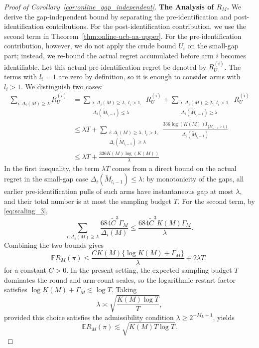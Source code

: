 \documentclass[
  12pt]{article}
\begin{document}
\begin{proof}[Proof of Corollary~\ref{cor:online_gap_independent}]

\textbf{The Analysis of $R_M$.} We derive the gap-independent bound by
separating the pre-identification and post-identification contributions. For the
post-identification contribution, we use the second term in
Theorem~\ref{thm:online-ucb-aa-upper}. For the pre-identification contribution,
however, we do not apply the crude bound \(U_i\) on the small-gap part; instead,
we re-bound the actual regret accumulated before arm \(i\) becomes identifiable.
Let this actual pre-identification regret be denoted by \(R_U^{(i)}\). The terms
with \(l_i=1\) are zero by definition, so it is enough to consider arms with
\(l_i>1\). We distinguish two cases:
	   \begin{align*}
	   \sum_{i:\Delta_i(M)\ge\lambda} R_{U}^{(i)} &= \sum_{\substack{i:\Delta_i(M)\ge\lambda,\; l_i>1,\\ \Delta_i(\tilde{M}_{l_i-1})\le\lambda}}  R_{U}^{(i)} + \sum_{\substack{i:\Delta_i(M)\ge\lambda,\; l_i>1,\\ \Delta_i(\tilde{M}_{l_i-1})\ge\lambda}}  R_{U}^{(i)}   \\
	   & \le \lambda T + \sum_{\substack{i:\Delta_i(M)\ge\lambda,\; l_i>1,\\ \Delta_i(\tilde{M}_{l_i-1})\ge\lambda}}  \frac{336 \log(K(M)) I_{ \{\tilde{M}_{l_i-1} >t_i\} } }{\Delta_i(\tilde{M}_{l_i-1})} \\
	   & \le \lambda T  + \frac{336 K(M) \log(K(M))}{\lambda}
	     \end{align*}
In the first inequality, the term \(\lambda T\) comes from a direct bound on
the actual regret in the small-gap case
\(\Delta_i(\tilde M_{l_i-1})\le\lambda\): by monotonicity of the gaps, all
earlier pre-identification pulls of such arms have instantaneous gap at most
\(\lambda\), and their total number is at most the sampling budget \(T\).
For the second term, by \eqref{eq:scaling_3},
\[
	\sum_{i:\Delta_i(M)\ge\lambda}
	\frac{684\tilde C^3\Gamma_M}{\Delta_i(M)}
	\le
	\frac{684\tilde C^3K(M)\Gamma_M}{\lambda}.
\]
Combining the two bounds gives
\[
\mathbb{E}R_M(\pi)
\le
\frac{C K(M)\{\log K(M)+\Gamma_M\}}{\lambda}
+2\lambda T ,
\]
for a constant \(C>0\). In the present setting, the expected sampling budget
\(T\) dominates the round and arm-count scales, so the logarithmic restart
factor satisfies \(\log K(M)+\Gamma_M\lesssim \log T\). Taking
\[
\lambda
\asymp
\sqrt{\frac{K(M)\log T}{T}},
\]
provided this choice satisfies the admissibility condition
\(\lambda\ge 2^{-M_L+1}\), yields
\[
\mathbb{E}R_M(\pi)
\lesssim
\sqrt{K(M)T\log T}.
\]



\end{proof}
\end{document}
